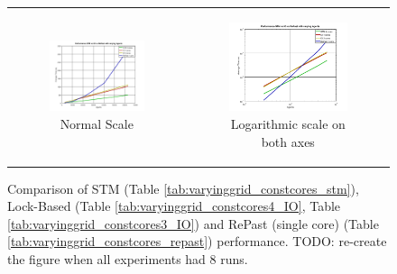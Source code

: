 \begin{figure}
\begin{center}
	\begin{tabular}{c c}
		\begin{subfigure}[b]{0.5\textwidth}
			\centering
			\includegraphics[width=1\textwidth, angle=0]{./fig/sir/stm_io_repast_varyinggrid_performance.png}
			\caption{Normal Scale}
		\end{subfigure}
    	&
		\begin{subfigure}[b]{0.5\textwidth}
			\centering
			\includegraphics[width=1\textwidth, angle=0]{./fig/sir/stm_io_repast_varyinggrid_performance_loglog.png}
			\caption{Logarithmic scale on both axes}
		\end{subfigure}
    \end{tabular}
	\caption{Comparison of STM (Table \ref{tab:varyinggrid_constcores_stm}), Lock-Based (Table \ref{tab:varyinggrid_constcores4_IO}, Table 					\ref{tab:varyinggrid_constcores3_IO}) and RePast (single core) (Table \ref{tab:varyinggrid_constcores_repast}) performance. TODO: re-create the figure when all experiments had 8 runs.}
	\label{fig:stm_io_repast_varyinggrid_performance}
\end{center}
\end{figure}

